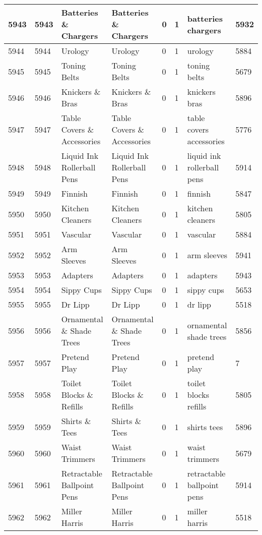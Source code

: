 \begin{longtable}{|l|l|l|l|l|l|l|l|}
5943 & 5943 & Batteries \& Chargers & Batteries \& Chargers & 0 & 1 & batteries chargers & 5932 \\ \hline 
5944 & 5944 & Urology & Urology & 0 & 1 & urology & 5884 \\ \hline 
5945 & 5945 & Toning Belts & Toning Belts & 0 & 1 & toning belts & 5679 \\ \hline 
5946 & 5946 & Knickers \& Bras & Knickers \& Bras & 0 & 1 & knickers bras & 5896 \\ \hline 
5947 & 5947 & Table Covers \& Accessories & Table Covers \& Accessories & 0 & 1 & table covers accessories & 5776 \\ \hline 
5948 & 5948 & Liquid Ink Rollerball Pens & Liquid Ink Rollerball Pens & 0 & 1 & liquid ink rollerball pens & 5914 \\ \hline 
5949 & 5949 & Finnish & Finnish & 0 & 1 & finnish & 5847 \\ \hline 
5950 & 5950 & Kitchen Cleaners & Kitchen Cleaners & 0 & 1 & kitchen cleaners & 5805 \\ \hline 
5951 & 5951 & Vascular & Vascular & 0 & 1 & vascular & 5884 \\ \hline 
5952 & 5952 & Arm Sleeves & Arm Sleeves & 0 & 1 & arm sleeves & 5941 \\ \hline 
5953 & 5953 & Adapters & Adapters & 0 & 1 & adapters & 5943 \\ \hline 
5954 & 5954 & Sippy Cups & Sippy Cups & 0 & 1 & sippy cups & 5653 \\ \hline 
5955 & 5955 & Dr Lipp & Dr Lipp & 0 & 1 & dr lipp & 5518 \\ \hline 
5956 & 5956 & Ornamental \& Shade Trees & Ornamental \& Shade Trees & 0 & 1 & ornamental shade trees & 5856 \\ \hline 
5957 & 5957 & Pretend Play & Pretend Play & 0 & 1 & pretend play & 7 \\ \hline 
5958 & 5958 & Toilet Blocks \& Refills & Toilet Blocks \& Refills & 0 & 1 & toilet blocks refills & 5805 \\ \hline 
5959 & 5959 & Shirts \& Tees & Shirts \& Tees & 0 & 1 & shirts tees & 5896 \\ \hline 
5960 & 5960 & Waist Trimmers & Waist Trimmers & 0 & 1 & waist trimmers & 5679 \\ \hline 
5961 & 5961 & Retractable Ballpoint Pens & Retractable Ballpoint Pens & 0 & 1 & retractable ballpoint pens & 5914 \\ \hline 
5962 & 5962 & Miller Harris & Miller Harris & 0 & 1 & miller harris & 5518 \\ \hline 

\end{longtable}
